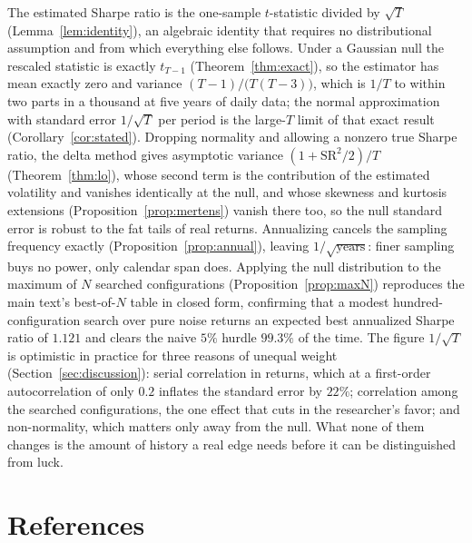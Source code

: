\documentclass[11pt]{article}
\theoremstyle{remark}
\theoremstyle{definition}
\newcommand{\SR}{\text{SR}}
\begin{document}
The estimated Sharpe ratio is the one-sample $t$-statistic divided by $\sqrt{T}$ (Lemma~\ref{lem:identity}), an algebraic identity that requires no distributional assumption and from which everything else follows. Under a Gaussian null the rescaled statistic is exactly $t_{T-1}$ (Theorem~\ref{thm:exact}), so the estimator has mean exactly zero and variance $(T-1)/\big(T(T-3)\big)$, which is $1/T$ to within two parts in a thousand at five years of daily data; the normal approximation with standard error $1/\sqrt{T}$ per period is the large-$T$ limit of that exact result (Corollary~\ref{cor:stated}). Dropping normality and allowing a nonzero true Sharpe ratio, the delta method gives asymptotic variance $(1+\SR^2/2)/T$ (Theorem~\ref{thm:lo}), whose second term is the contribution of the estimated volatility and vanishes identically at the null, and whose skewness and kurtosis extensions (Proposition~\ref{prop:mertens}) vanish there too, so the null standard error is robust to the fat tails of real returns. Annualizing cancels the sampling frequency exactly (Proposition~\ref{prop:annual}), leaving $1/\sqrt{\text{years}}$: finer sampling buys no power, only calendar span does. Applying the null distribution to the maximum of $N$ searched configurations (Proposition~\ref{prop:maxN}) reproduces the main text's best-of-$N$ table in closed form, confirming that a modest hundred-configuration search over pure noise returns an expected best annualized Sharpe ratio of $1.121$ and clears the naive $5\%$ hurdle $99.3\%$ of the time. The figure $1/\sqrt{T}$ is optimistic in practice for three reasons of unequal weight (Section~\ref{sec:discussion}): serial correlation in returns, which at a first-order autocorrelation of only $0.2$ inflates the standard error by $22\%$; correlation among the searched configurations, the one effect that cuts in the researcher's favor; and non-normality, which matters only away from the null. What none of them changes is the amount of history a real edge needs before it can be distinguished from luck.

\section*{References}
\end{document}
